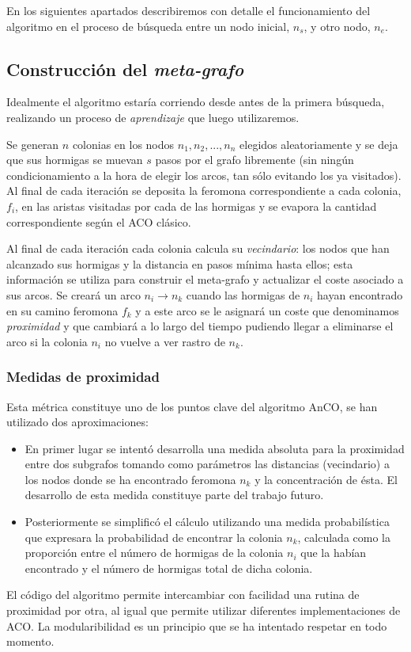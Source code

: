 \documentclass{llncs}
\begin{document}
En los siguientes apartados describiremos con detalle el funcionamiento del algoritmo en el proceso de b{\'u}squeda entre un nodo inicial, $n_s$, y otro nodo, $n_e$.

\subsection{Construcci{\'o}n del \textit{meta-grafo}}
Idealmente el algoritmo estar{\'i}a corriendo desde antes de la primera b{\'u}squeda, realizando un proceso de \textit{aprendizaje} que luego utilizaremos.

Se generan $n$ colonias en los nodos $n_1, n_2,..., n_n$ elegidos aleatoriamente y se deja que sus hormigas se muevan $s$ pasos por el grafo libremente (sin ning{\'u}n condicionamiento a la hora de elegir los arcos, tan s{\'o}lo evitando los ya visitados).
Al final de cada iteraci{\'o}n se deposita la feromona correspondiente a cada colonia, $f_i$, en las aristas visitadas por cada de las hormigas y se evapora la cantidad correspondiente seg{\'u}n el ACO cl{\'a}sico.

Al final de cada iteraci{\'o}n cada colonia calcula su \textit{vecindario}: los nodos que han alcanzado sus hormigas y la distancia en pasos m{\'i}nima hasta ellos; esta informaci{\'o}n se utiliza para construir el meta-grafo y actualizar el coste asociado a sus arcos.
Se crear{\'a} un arco $n_i \rightarrow n_k$ cuando las hormigas de $n_i$ hayan encontrado en su camino feromona $f_k$ y a este arco se le asignar{\'a} un coste que denominamos \textit{proximidad} y que cambiar{\'a} a lo largo del tiempo pudiendo llegar a eliminarse el arco si la colonia $n_i$ no vuelve a ver rastro de $n_k$.

\subsubsection{Medidas de proximidad}
Esta m{\'e}trica constituye uno de los puntos clave del algoritmo AnCO, se han utilizado dos aproximaciones:
\begin{itemize}
  \item En primer lugar se intent{\'o} desarrolla una medida absoluta para la proximidad entre dos subgrafos tomando como par{\'a}metros las distancias (vecindario) a los nodos donde se ha encontrado feromona $n_k$ y la concentraci{\'o}n de {\'e}sta. El desarrollo de esta medida constituye parte del trabajo futuro.
  \item Posteriormente se simplific{\'o} el c{\'a}lculo utilizando una medida probabil{\'i}stica que expresara la probabilidad de encontrar la colonia $n_k$, calculada como la proporci{\'o}n entre el n{\'u}mero de hormigas de la colonia $n_i$ que la hab{\'i}an encontrado y el n{\'u}mero de hormigas total de dicha colonia.
\end{itemize}
El c{\'o}digo del algoritmo permite intercambiar con facilidad una rutina de proximidad por otra, al igual que permite utilizar diferentes implementaciones de ACO.
La modularibilidad es un principio que se ha intentado respetar en todo momento.
\end{document}

